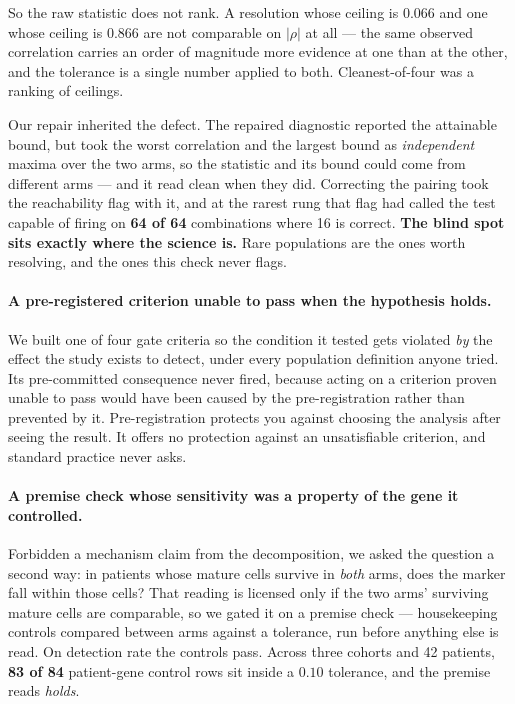 So the raw statistic does not rank. A resolution whose ceiling is 0.066 and one
whose ceiling is 0.866 are not comparable on $|\rho|$ at all --- the same
observed correlation carries an order of magnitude more evidence at one than at
the other, and the tolerance is a single number applied to both.
Cleanest-of-four was a ranking of ceilings.

Our repair inherited the defect. The repaired diagnostic reported the attainable
bound, but took the worst correlation and the largest bound as
\emph{independent} maxima over the two arms, so the statistic and its bound
could come from different arms --- and it read clean when they did. Correcting
the pairing took the reachability flag with it, and at the rarest rung that flag
had called the test capable of firing on \textbf{64 of 64} combinations where 16
is correct.
\textbf{The blind spot sits exactly where the science is.} Rare populations are
the ones worth resolving, and the ones this check never flags.

\paragraph{A pre-registered criterion unable to pass when the hypothesis holds.}
We built one of four gate criteria so the condition it tested gets violated
\emph{by} the effect the study exists to detect, under every population
definition anyone tried. Its pre-committed consequence never fired, because
acting on a criterion proven unable to pass would have been caused by the
pre-registration rather than prevented by it. Pre-registration protects you
against choosing the analysis after seeing the result. It offers no protection
against an unsatisfiable criterion, and standard practice never asks.


\paragraph{A premise check whose sensitivity was a property of the gene it
controlled.} Forbidden a mechanism claim from the decomposition, we asked the
question a second way: in patients whose mature cells survive in \emph{both}
arms, does the marker fall within those cells? That reading is licensed only if
the two arms' surviving mature cells are comparable, so we gated it on a premise
check --- housekeeping controls compared between arms against a tolerance, run
before anything else is read. On detection rate the controls pass. Across three
cohorts and 42 patients, \textbf{83 of 84} patient-gene control rows sit inside a
$0.10$ tolerance, and the premise reads \emph{holds}.

